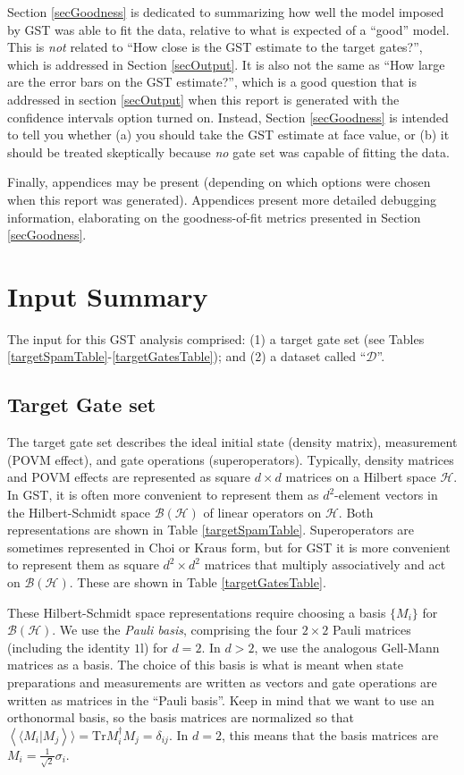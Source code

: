 \documentclass{article}[11pt]
\newcommand{\rrangle}{\rangle\!\rangle} \newcommand{\llangle}{\langle\!\langle}
\newcommand{\sbraket}[2]{\ensuremath{\left\llangle#1|#2\right\rrangle}}
\def\Id{1\!\mathrm{l}}
\newcommand{\Tr}[0]{\mathrm{Tr}}
\begin{document}
Section \ref{secGoodness} is dedicated to summarizing how well the model imposed by GST was able to fit the data, relative to what is expected of a ``good'' model.  This is \emph{not} related to ``How close is the GST estimate to the target gates?'', which is addressed in Section \ref{secOutput}.  It is also not the same as ``How large are the error bars on the GST estimate?'', which is a good question that is addressed in section \ref{secOutput} when this report is generated with the confidence intervals option turned on.  Instead, Section \ref{secGoodness} is intended to tell you whether (a) you should take the GST estimate at face value, or (b) it should be treated skeptically because \emph{no} gate set was capable of fitting the data.

Finally, appendices may be present (depending on which options were chosen when this report was generated).  Appendices present more detailed debugging information, elaborating on the goodness-of-fit metrics presented in Section \ref{secGoodness}.

\section{Input Summary\label{secInput}}
The input for this GST analysis comprised: (1) a target gate set (see Tables \ref{targetSpamTable}-\ref{targetGatesTable}); and (2) a dataset called ``$\mathcal{D}$''.

\subsection{Target Gate set}

The target gate set describes the ideal initial state (density matrix), measurement (POVM effect), and gate operations (superoperators).  Typically, density matrices and POVM effects are represented as square $d\times d$ matrices on a Hilbert space $\mathcal{H}$.  In GST, it is often more convenient to represent them as $d^2$-element vectors in the Hilbert-Schmidt space $\mathcal{B}(\mathcal{H})$ of linear operators on $\mathcal{H}$.  Both representations are shown in Table \ref{targetSpamTable}.  Superoperators are sometimes represented in Choi or Kraus form, but for GST it is more convenient to represent them as square $d^2\times d^2$ matrices that multiply associatively and act on $\mathcal{B}(\mathcal{H})$.  These are shown in Table \ref{targetGatesTable}.

These Hilbert-Schmidt space representations require choosing a basis $\{M_i\}$ for $\mathcal{B}(\mathcal{H})$.  We use the \emph{Pauli basis}, comprising the four $2\times2$ Pauli matrices (including the identity $\Id$) for $d=2$.  In $d>2$, we use the analogous Gell-Mann matrices as a basis.   The choice of this basis is what is meant when state preparations and measurements are written as vectors and gate operations are written as matrices in the ``Pauli basis''.  Keep in mind that we want to use an orthonormal basis, so the basis matrices are normalized so that $\sbraket{M_i}{M_j} = \Tr M_i^\dagger M_j = \delta_{ij}$.  In $d=2$, this means that the basis matrices are $M_i = \frac{1}{\sqrt{2}}\sigma_i$.
\end{document}

